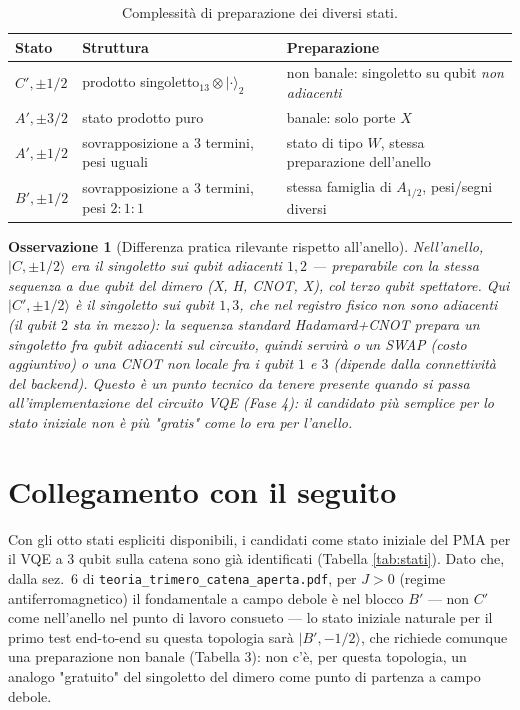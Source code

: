 \documentclass[11pt,a4paper]{article}
\newtheorem{osservazione}{Osservazione}
\begin{document}
\begin{table}[h]
\centering
\begin{tabular}{@{}lll@{}}
\toprule
Stato & Struttura & Preparazione\\
\midrule
$C',\pm1/2$ & prodotto singoletto$_{13}\otimes|\cdot\rangle_2$ & non banale: singoletto su qubit \emph{non adiacenti}\\
$A',\pm3/2$ & stato prodotto puro & banale: solo porte $X$\\
$A',\pm1/2$ & sovrapposizione a 3 termini, pesi uguali & stato di tipo $W$, stessa preparazione dell'anello\\
$B',\pm1/2$ & sovrapposizione a 3 termini, pesi $2{:}1{:}1$ & stessa famiglia di $A_{1/2}$, pesi/segni diversi\\
\bottomrule
\end{tabular}
\caption{Complessità di preparazione dei diversi stati.}
\end{table}

\begin{osservazione}[Differenza pratica rilevante rispetto all'anello]
Nell'anello, $|C,\pm1/2\rangle$ era il singoletto sui qubit \emph{adiacenti}
$1,2$ — preparabile con la stessa sequenza a due qubit del dimero (X, H,
CNOT, X), col terzo qubit spettatore. Qui $|C',\pm1/2\rangle$ è il
singoletto sui qubit $1,3$, che nel registro fisico \emph{non sono
adiacenti} (il qubit $2$ sta in mezzo): la sequenza standard
Hadamard+CNOT prepara un singoletto fra qubit adiacenti sul circuito, quindi
servirà o un SWAP (costo aggiuntivo) o una CNOT non locale fra i qubit $1$
e $3$ (dipende dalla connettività del backend). Questo è un punto tecnico
da tenere presente quando si passa all'implementazione del circuito VQE
(Fase 4): il candidato più semplice per lo stato iniziale non è più "gratis"
come lo era per l'anello.
\end{osservazione}

\section{Collegamento con il seguito}

Con gli otto stati espliciti disponibili, i candidati come stato iniziale
del PMA per il VQE a 3 qubit sulla catena sono già identificati (Tabella
\ref{tab:stati}). Dato che, dalla sez.~6 di \texttt{teoria\_trimero\_catena\_aperta.pdf},
per $J>0$ (regime antiferromagnetico) il fondamentale a campo debole è nel
blocco $B'$ — non $C'$ come nell'anello nel punto di lavoro consueto — lo
stato iniziale naturale per il primo test end-to-end su questa topologia
sarà $|B',-1/2\rangle$, che richiede comunque una preparazione non banale
(Tabella 3): non c'è, per questa topologia, un analogo "gratuito" del
singoletto del dimero come punto di partenza a campo debole.
\end{document}
